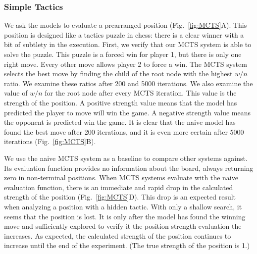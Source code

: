 \documentclass[10pt]{article}
\begin{document}
\subsubsection{Simple Tactics}
We ask the models to evaluate a prearranged position (Fig.~\ref{fig:MCTS}A). This position is designed like a tactics puzzle in chess: there is a clear winner with a bit of subtlety in the execution. First, we verify that our MCTS system is able to solve the puzzle. This puzzle is a forced win for player 1, but there is only one right move. Every other move allows player 2 to force a win. The MCTS system selects the best move by finding the child of the root node with the highest $w / n$ ratio. We examine these ratios after 200 and 5000 iterations. We also examine the value of $w / n$ for the root node after every MCTS iteration. This value is the strength of the position. A positive strength value means that the model has predicted the player to move will win the game. A negative strength value means the opponent is predicted win the game. It is clear that the naive model has found the best move after 200 iterations, and it is even more certain after 5000 iterations (Fig.~\ref{fig:MCTS}B).

We use the naive MCTS system as a baseline to compare other systems against. Its evaluation function provides no information about the board, always returning zero in non-terminal positions. When MCTS systems evaluate with the naive evaluation function, there is an immediate and rapid drop in the calculated strength of the position (Fig.~\ref{fig:MCTS}D). This drop is an expected result when analyzing a position with a hidden tactic. With only a shallow search, it seems that the position is lost. It is only after the model has found the winning move and sufficiently explored to verify it the position strength evaluation the increases. As expected, the calculated strength of the position continues to increase until the end of the experiment. (The true strength of the position is 1.)
\end{document}
